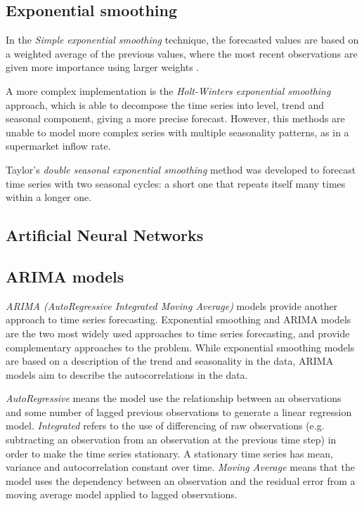 \subsection{Exponential smoothing}
In the \emph{Simple exponential smoothing} technique, the forecasted values are based on a weighted average of the previous values, where the most recent observations are given more importance using larger weights \cite{hyndman}.

A more complex implementation is the \emph{Holt-Winters exponential smoothing} approach, which is able to decompose the time series into level, trend and seasonal component, giving a more precise forecast. However, this methods are unable to model more complex series with multiple seasonality patterns, as in a supermarket inflow rate.

Taylor’s \emph{double seasonal exponential smoothing} method \cite{taylor} was developed to forecast time series with two seasonal cycles: a short one that repeats itself many times within a longer one.


\subsection{Artificial Neural Networks}


\subsection{ARIMA models}
\emph{ARIMA (AutoRegressive Integrated Moving Average)} models provide another approach to time series forecasting. Exponential smoothing and ARIMA models are the two most widely used approaches to time series forecasting, and provide complementary approaches to the problem. While exponential smoothing models are based on a description of the trend and seasonality in the data, ARIMA models aim to describe the autocorrelations in the data.\cite{hyndman}

\emph{AutoRegressive} means the model use the relationship between an observations and some number of lagged previous observations to generate a linear regression model. \emph{Integrated} refers to the use of differencing of raw observations (e.g. subtracting an observation from an observation at the previous time step) in order to make the time series stationary. A stationary time series has mean, variance and autocorrelation constant over time. \emph{Moving Average} means that the model uses the dependency between an observation and the residual error from a moving average model applied to lagged observations.

